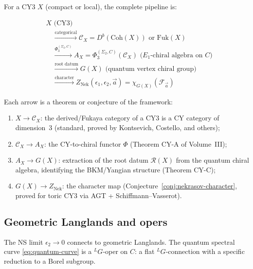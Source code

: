 \documentclass[11pt]{article}
\theoremstyle{definition}
\theoremstyle{remark}
\newcommand{\cC}{\mathcal{C}}
\newcommand{\cF}{\mathcal{F}}
\newcommand{\Fuk}{\mathrm{Fuk}}
\newcommand{\Coh}{\mathrm{Coh}}
\newcommand{\Nek}{\mathrm{Nek}}
\newcommand{\Eone}{E_1}
\begin{document}
For a CY3 $X$ (compact or local), the complete pipeline is:

\begin{equation}
 \label{eq:pipeline}
 \boxed{
 \begin{aligned}
 &X \text{ (CY3)} \\
 &\quad \xrightarrow{\text{categorical}} \cC_X = D^b(\Coh(X)) \text{ or } \Fuk(X) \\
 &\quad \xrightarrow{\Phi^{(\Sigma_2,C)}_3} A_X = \Phi^{(\Sigma_2,C)}_3(\cC_X) \text{ ($\Eone$-chiral algebra on $C$)} \\
 &\quad \xrightarrow{\text{root datum}} G(X) \text{ (quantum vertex chiral group)} \\
 &\quad \xrightarrow{\text{character}} Z_{\Nek}(\epsilon_1, \epsilon_2, \vec{a}) = \chi_{G(X)}(\cF_{\vec{a}})
 \end{aligned}
 }
\end{equation}

Each arrow is a theorem or conjecture of the framework:
\begin{enumerate}[label=(\arabic*)]
 \item $X \to \cC_X$: the derived/Fukaya category of a CY3 is a CY category of dimension~3
 (standard, proved by Kontsevich, Costello, and others);
 \item $\cC_X \to A_X$: the CY-to-chiral functor $\Phi$ (Theorem CY-A of Volume~III);
 \item $A_X \to G(X)$: extraction of the root datum $\mathcal{R}(X)$ from the quantum chiral
 algebra, identifying the BKM/Yangian structure (Theorem CY-C);
 \item $G(X) \to Z_{\Nek}$: the character map (Conjecture~\ref{conj:nekrasov-character},
 proved for toric CY3 via AGT + Schiffmann--Vasserot).
\end{enumerate}

\subsection{Geometric Langlands and opers}
\label{subsec:langlands-opers}

The NS limit $\epsilon_2 \to 0$ connects to geometric Langlands.
The quantum spectral curve \eqref{eq:quantum-curve} is a ${}^L G$-oper on $C$: a flat
${}^L G$-connection with a specific reduction to a Borel subgroup.
\end{document}
